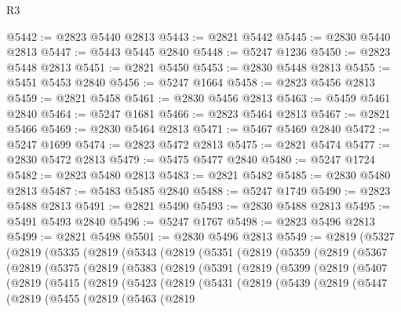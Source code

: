 \begin{lexlean}{R3}
\begin{coremodule}
@5442 := @2823 @5440 @2813
@5443 := @2821 @5442
@5445 := @2830 @5440 @2813
@5447 := @5443 @5445 @2840
@5448 := @5247 @1236
@5450 := @2823 @5448 @2813
@5451 := @2821 @5450
@5453 := @2830 @5448 @2813
@5455 := @5451 @5453 @2840
@5456 := @5247 @1664
@5458 := @2823 @5456 @2813
@5459 := @2821 @5458
@5461 := @2830 @5456 @2813
@5463 := @5459 @5461 @2840
@5464 := @5247 @1681
@5466 := @2823 @5464 @2813
@5467 := @2821 @5466
@5469 := @2830 @5464 @2813
@5471 := @5467 @5469 @2840
@5472 := @5247 @1699
@5474 := @2823 @5472 @2813
@5475 := @2821 @5474
@5477 := @2830 @5472 @2813
@5479 := @5475 @5477 @2840
@5480 := @5247 @1724
@5482 := @2823 @5480 @2813
@5483 := @2821 @5482
@5485 := @2830 @5480 @2813
@5487 := @5483 @5485 @2840
@5488 := @5247 @1749
@5490 := @2823 @5488 @2813
@5491 := @2821 @5490
@5493 := @2830 @5488 @2813
@5495 := @5491 @5493 @2840
@5496 := @5247 @1767
@5498 := @2823 @5496 @2813
@5499 := @2821 @5498
@5501 := @2830 @5496 @2813
@5549 := @2819
    (@5327
      (@2819
        (@5335
          (@2819
            (@5343
              (@2819
                (@5351
                  (@2819
                    (@5359
                      (@2819
                        (@5367
                          (@2819
                            (@5375
                              (@2819
                                (@5383
                                  (@2819
                                    (@5391
                                      (@2819
                                        (@5399
                                          (@2819
                                            (@5407
                                              (@2819
                                                (@5415
                                                  (@2819
                                                    (@5423
                                                      (@2819
                                                        (@5431
                                                          (@2819
                                                            (@5439
                                                              (@2819
                                                                (@5447
                                                                  (@2819
                                                                    (@5455
                                                                      (@2819
                                                                        (@5463
                                                                          (@2819

\end{coremodule}
\end{lexlean}
